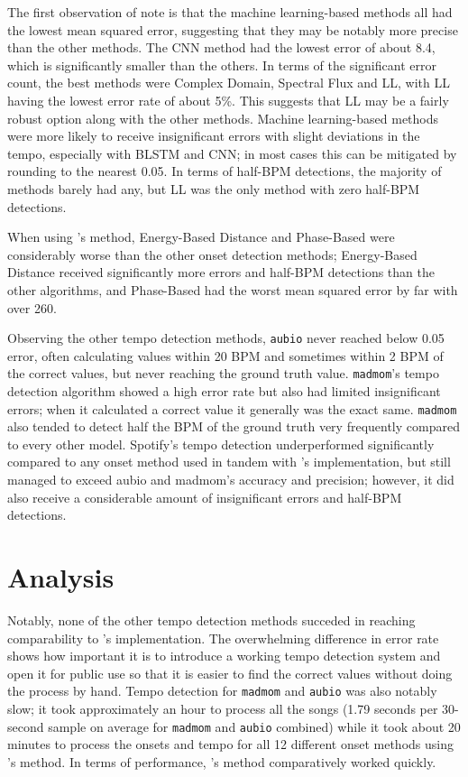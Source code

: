 \documentclass[11pt, oneside]{article}
\begin{document}
The first observation of note is that the machine learning-based methods all had
the lowest mean squared error, suggesting that they may be notably more precise
than the other methods. The CNN method had the lowest error of about 8.4, which
is significantly smaller than the others. In terms of the significant error
count, the best methods were Complex Domain, Spectral Flux and LL, with LL
having the lowest error rate of about 5\%. This suggests that LL may be a fairly
robust option along with the other methods. Machine learning-based methods were
more likely to receive insignificant errors with slight deviations in the tempo,
especially with BLSTM and CNN; in most cases this can be mitigated by rounding
to the nearest 0.05. In terms of half-BPM detections, the majority of methods
barely had any, but LL was the only method with zero half-BPM detections.

When using \citeauthor*{bram}'s method, Energy-Based Distance and Phase-Based
were considerably worse than the other onset detection methods; Energy-Based
Distance received significantly more errors and half-BPM detections than the
other algorithms, and Phase-Based had the worst mean squared error by far with
over 260. 

Observing the other tempo detection methods, \texttt{aubio} never reached below
0.05 error, often calculating values within 20 BPM and sometimes within 2 BPM of
the correct values, but never reaching the ground truth value. \texttt{madmom}'s
tempo detection algorithm showed a high error rate but also had limited
insignificant errors; when it calculated a correct value it generally was the
exact same. \texttt{madmom} also tended to detect half the BPM of the ground
truth very frequently compared to every other model. Spotify's tempo detection
underperformed significantly compared to any onset method used in tandem with
\citeauthor*{bram}'s implementation, but still managed to exceed aubio and
madmom's accuracy and precision; however, it did also receive a considerable
amount of insignificant errors and half-BPM detections.


\section{Analysis}

Notably, none of the other tempo detection methods succeded in reaching
comparability to \citeauthor*{bram}'s implementation. The overwhelming
difference in error rate shows how important it is to introduce a working tempo
detection system and open it for public use so that it is easier to find the
correct values without doing the process by hand. Tempo detection for
\texttt{madmom} and \texttt{aubio} was also notably slow; it took approximately
an hour to process all the songs (1.79 seconds per 30-second sample on average
for \texttt{madmom} and \texttt{aubio} combined) while it took about 20 minutes
to process the onsets and tempo for all 12 different onset methods using
\citeauthor*{bram}'s method. In terms of performance, \citeauthor*{bram}'s
method comparatively worked quickly.
\end{document}
